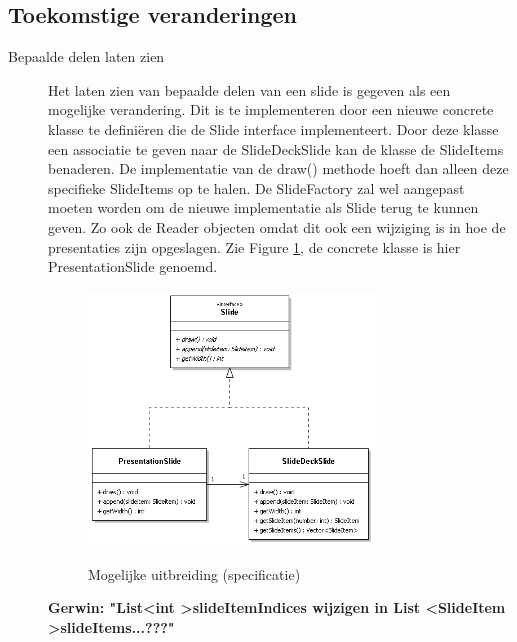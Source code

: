 \documentclass[a4paper]{article}
\begin{document}
\subsection{Toekomstige veranderingen}
\begin{description}
\item[Bepaalde delen laten zien] Het laten zien van bepaalde delen van een slide is gegeven als een mogelijke verandering. Dit is te implementeren door een nieuwe concrete klasse te definiëren die de Slide interface implementeert. Door deze klasse een associatie te geven naar de SlideDeckSlide kan de klasse de SlideItems benaderen. De implementatie van de draw() methode hoeft dan alleen deze specifieke SlideItems op te halen. De SlideFactory zal wel aangepast moeten worden om de nieuwe implementatie als Slide terug te kunnen geven. Zo ook de Reader objecten omdat dit ook een wijziging is in hoe de presentaties zijn opgeslagen. Zie Figure \ref{fig:mogelijkeuitbreiding}, de concrete klasse is hier PresentationSlide genoemd.
\begin{figure}[htbp]
\caption{Mogelijke uitbreiding (specificatie)}
\centering
\includegraphics[width=0.75\textwidth]{MogelijkeUitbreiding.PNG}
\label{fig:mogelijkeuitbreiding}
\end{figure}

\textbf{Gerwin: "List\textless int \textgreater slideItemIndices wijzigen in List \textless SlideItem \textgreater slideItems...???"}


\end{description}
\end{document}
